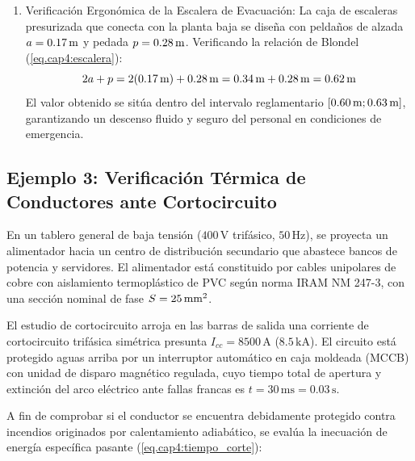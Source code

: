 \begin{enumerate}
\begin{equation}
          ME = \frac{4}{4} + 1 = 2 \text{ medios de escape independientes}
          \end{equation}
          Esto impone la apertura de dos salidas diferenciadas de $2\UAS$ ($1.10\m$) cada una, ubicadas en extremos opuestos
          de la planta para impedir que un foco ígneo anule simultáneamente ambas vías de evacuación, verificando que la
          distancia máxima hacia cualquiera de ellas no supere los $40\m$.
    \item Verificación Ergonómica de la Escalera de Evacuación: La caja de escaleras presurizada que conecta con la planta
          baja se diseña con peldaños de alzada $a = 0.17\,\mathrm{m}$ y pedada $p = 0.28\,\mathrm{m}$. Verificando la relación de Blondel
          (\ref{eq.cap4:escalera}):
          \begin{equation}
          2a + p = 2(0.17\,\mathrm{m}) + 0.28\,\mathrm{m} = 0.34\,\mathrm{m} + 0.28\,\mathrm{m} = 0.62\,\mathrm{m}
          \end{equation}
          El valor obtenido se sitúa dentro del intervalo reglamentario $[0.60\,\mathrm{m}; 0.63\,\mathrm{m}]$, garantizando un descenso fluido
          y seguro del personal en condiciones de emergencia.
\end{enumerate}

\subsection{Ejemplo 3: Verificación Térmica de Conductores ante Cortocircuito}
\label{sec.cap4:ejemplo_cortocircuito}

En un tablero general de baja tensión ($400\,\mathrm{V}$ trifásico, $50\,\mathrm{Hz}$), se proyecta un alimentador hacia un
centro de distribución secundario que abastece bancos de potencia y servidores. El alimentador está constituido por cables
unipolares de cobre con aislamiento termoplástico de PVC según norma IRAM NM 247-3, con una sección nominal de fase
$S = 25\,\mathrm{mm}^2$.

El estudio de cortocircuito arroja en las barras de salida una corriente de cortocircuito trifásica simétrica presunta
$I_{cc} = 8500\,\mathrm{A}$ ($8.5\,\mathrm{kA}$). El circuito está protegido aguas arriba por un interruptor automático en
caja moldeada (MCCB) con unidad de disparo magnético regulada, cuyo tiempo total de apertura y extinción del arco eléctrico
ante fallas francas es $t = 30\,\mathrm{ms} = 0.03\,\mathrm{s}$.

A fin de comprobar si el conductor se encuentra debidamente protegido contra incendios originados por calentamiento
adiabático, se evalúa la inecuación de energía específica pasante (\ref{eq.cap4:tiempo_corte}):

